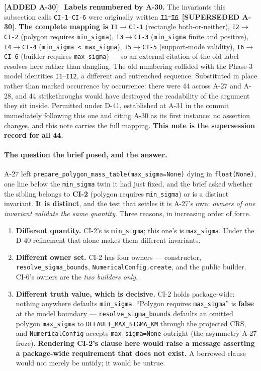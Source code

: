 \documentclass[
  10pt,
]{article}
\providecommand{\tightlist}{%
  \setlength{\itemsep}{0pt}\setlength{\parskip}{0pt}}
\newcommand{\amdstrike}[1]{\sout{#1}}
\newcommand{\amdstrike}[1]{\textcolor{supcolor}{#1}}
\newcommand{\amdnew}[1]{{\color{amdcolor}\footnotesize\textbf{[ADDED #1]}}\ }
\newcommand{\supsd}[2]{{\color{supcolor}\amdstrike{#2}}~{\color{amdcolor}\footnotesize\textbf{[SUPERSEDED #1]}}}
\begin{document}
\amdnew{A-30} \textbf{Labels renumbered by A-30.} The invariants this subsection calls \texttt{CI-1}--\texttt{CI-6} were originally written \supsd{A-30}{\texttt{I1}--\texttt{I6}}. \textbf{The complete mapping is} \texttt{I1}$\rightarrow$\texttt{CI-1} (rectangle both-or-neither), \texttt{I2}$\rightarrow$\texttt{CI-2} (polygon requires \texttt{min\_sigma}), \texttt{I3}$\rightarrow$\texttt{CI-3} (\texttt{min\_sigma} finite and positive), \texttt{I4}$\rightarrow$\texttt{CI-4} (\texttt{min\_sigma < max\_sigma}), \texttt{I5}$\rightarrow$\texttt{CI-5} (support-mode validity), \texttt{I6}$\rightarrow$\texttt{CI-6} (builder requires \texttt{max\_sigma}) --- so an external citation of the old label resolves here rather than dangling. The old numbering collided with the Phase-3 model identities \texttt{I1}--\texttt{I12}, a different and entrenched sequence. Substituted in place rather than marked occurrence by occurrence: there were 44 across A-27 and A-28, and 44 strikethroughs would have destroyed the readability of the argument they sit inside. Permitted under D-41, established at A-31 in the commit immediately following this one and citing A-30 as its first instance: no assertion changes, and this note carries the full mapping. \textbf{This note is the supersession record for all 44.}

\paragraph{The question the brief posed, and the answer.}
A-27 left \texttt{prepare\_polygon\_mass\_table(max\_sigma=None)} dying in \texttt{float(None)}, one line below the \texttt{min\_sigma} twin it had just fixed, and the brief asked whether the sibling belongs to \textbf{CI-2} (polygon requires \texttt{min\_sigma}) or is a distinct invariant. \textbf{It is distinct}, and the test that settles it is A-27's own: \emph{owners of one invariant validate the same quantity}. Three reasons, in increasing order of force.

\begin{enumerate}
\tightlist
\item \textbf{Different quantity.} CI-2's is \texttt{min\_sigma}; this one's is \texttt{max\_sigma}. Under the D-40 refinement that alone makes them different invariants.
\item \textbf{Different owner set.} CI-2 has four owners --- constructor, \texttt{resolve\_sigma\_bounds}, \texttt{NumericalConfig.create}, and the public builder. CI-6's owners are the \emph{two builders only}.
\item \textbf{Different truth value, which is decisive.} CI-2 holds package-wide: nothing anywhere defaults \texttt{min\_sigma}. ``Polygon requires \texttt{max\_sigma}'' is \textbf{false} at the model boundary --- \texttt{resolve\_sigma\_bounds} defaults an omitted polygon \texttt{max\_sigma} to \texttt{DEFAULT\_MAX\_SIGMA\_KM} through the projected CRS, and \texttt{NumericalConfig} accepts \texttt{max\_sigma=None} outright (the asymmetry A-27 froze). \textbf{Rendering CI-2's clause here would raise a message asserting a package-wide requirement that does not exist.} A borrowed clause would not merely be untidy; it would be untrue.
\end{enumerate}
\end{document}

